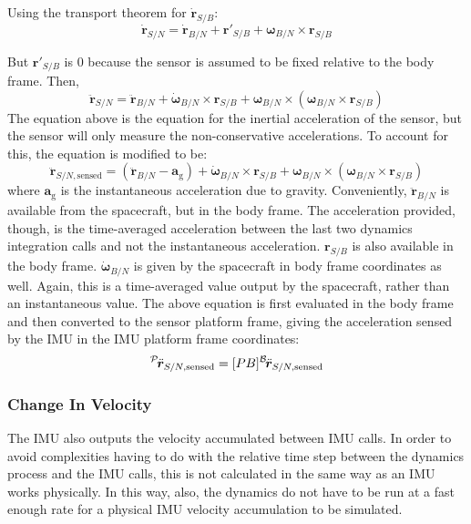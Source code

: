 Using the transport theorem for $\dot{\bm{r}}_{S/B}$:
\begin{equation}
	\dot{\bm{r}}_{S/N} = \dot{\bm{r}}_{B/N} + \bm{r}'_{S/B} + \bm{\omega}_{B/N} \times \bm{r}_{S/B}
	\label{eq:rDot}
\end{equation}

But $\bm{r}'_{S/B}$ is $0$ because the sensor is assumed to be fixed relative to the body frame. Then,
\begin{equation}
\ddot{\bm{r}}_{S/N} = \ddot{\bm{r}}_{B/N} + \dot{\bm{\omega}}_{B/N} \times \bm{r}_{S/B} +  \bm{\omega}_{B/N} \times (\bm{\omega}_{B/N} \times \bm{r}_{S/B})
\end{equation}
The equation above is the equation for the inertial acceleration of the sensor, but the sensor will only measure the non-conservative accelerations. To account for this, the equation is modified to be:
\begin{equation}
\ddot{\bm{r}}_{S/N, \textrm{sensed}} = (\ddot{\bm{r}}_{B/N} - \bm{a}_\textrm{g}) + \dot{\bm{\omega}}_{B/N} \times \bm{r}_{S/B} +  \bm{\omega}_{B/N} \times (\bm{\omega}_{B/N} \times \bm{r}_{S/B})
\end{equation}
where $\bm{a}_\textrm{g}$ is the instantaneous acceleration due to gravity. Conveniently, $\ddot{\bm{r}}_{B/N}$ is available from the spacecraft, but in the body frame. The acceleration provided, though, is the time-averaged acceleration between the last two dynamics integration calls and not the instantaneous acceleration. $\bm{r}_{S/B}$ is also available in the body frame. $\dot{\bm{\omega}}_{B/N}$ is given by the spacecraft in body frame coordinates as well. Again, this is a time-averaged value output by the spacecraft, rather than an instantaneous value. The above equation is first evaluated in the body frame and then converted to the sensor platform frame, giving the acceleration sensed by the IMU in the IMU platform frame coordinates:
\begin{equation}
	\leftexp{P}{\ddot{\bm{r}}_{S/N, \textrm{sensed}}} = [PB] \leftexp{B}{ \ddot{\bm{r}}_{S/N, \textrm{sensed}}}
\end{equation}

\subsubsection{Change In Velocity}
The IMU also outputs the velocity accumulated between IMU calls. In order to avoid complexities having to do with the relative time step between the dynamics process and the IMU calls, this is not calculated in the same way as an IMU works physically. In this way, also, the dynamics do not have to be run at a fast enough rate for a physical IMU velocity accumulation to be simulated.

